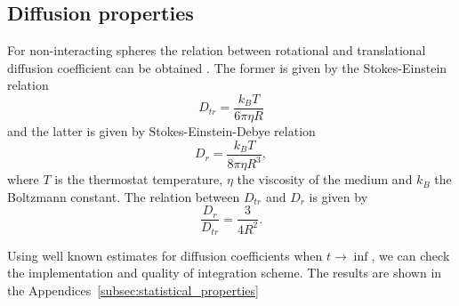\subsection{Diffusion properties}
For non-interacting spheres the relation between rotational and translational diffusion coefficient can be obtained \cite{C5SM02754C}. The former is given by the Stokes-Einstein relation
\begin{equation}
\label{eq:translational_diffusion_coefficient}
	D_{tr} = \frac{k_B T}{6 \pi \eta R}
\end{equation}
and the latter is given by Stokes-Einstein-Debye relation
\begin{equation}
\label{eq:rotational_diffusion_coefficient}
	D_r = \frac{k_B T}{8 \pi \eta R^3}
	,
\end{equation}
where $T$ is the thermostat temperature, $\eta$ the viscosity of the medium and $k_B$ the Boltzmann constant. The relation between $D_{tr}$ and $D_r$ is given by
\begin{equation}
	\frac{D_r}{D_{tr}} = \frac{3}{4 R^2}
	.
\end{equation}

Using well known estimates for diffusion coefficients when $t \rightarrow \inf$, we can check the implementation and quality of integration scheme. The results are shown in the Appendices~\ref{subsec:statistical_properties}
